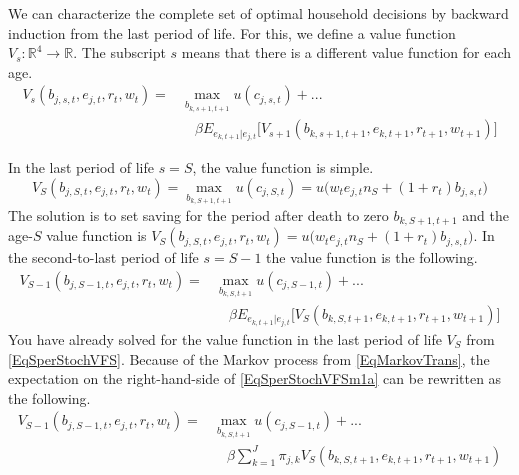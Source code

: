 \documentclass[letterpaper,12pt]{article}
\theoremstyle{definition}
\numberwithin{equation}{section}
\numberwithin{exercise}{section}
\begin{document}
\begin{spacing}{1.5}
      We can characterize the complete set of optimal household decisions by backward induction from the last period of life. For this, we define a value function $V_s:\mathbb{R}^4\rightarrow\mathbb{R}$. The subscript $s$ means that there is a different value function for each age.
      \begin{equation}\label{EqSperStochVF}
         \begin{split}
            V_s\left(b_{j,s,t},e_{j,t},r_t,w_t\right) = &\max_{b_{k,s+1,t+1}} u\left(c_{j,s,t}\right) + ... \\
            &\quad\beta E_{e_{k,t+1}|e_{j,t}}\bigl[V_{s+1}\left(b_{k,s+1,t+1},e_{k,t+1},r_{t+1},w_{t+1}\right)\bigr]
         \end{split}
      \end{equation}

      In the last period of life $s=S$, the value function is simple.
      \begin{equation}\label{EqSperStochVFS}
         V_{S}\left(b_{j,S,t},e_{j,t},r_t,w_t\right) = \max_{b_{k,S+1,t+1}} u\left(c_{j,S,t}\right) = u\bigl(w_t e_{j,t}n_{S} + (1 + r_t)b_{j,s,t}\bigr)
      \end{equation}
      The solution is to set saving for the period after death to zero $b_{k,S+1,t+1}$ and the age-$S$ value function is $V_{S}\left(b_{j,S,t},e_{j,t},r_t,w_t\right) = u\bigl(w_t e_{j,t}n_{S} + (1 + r_t)b_{j,s,t}\bigr)$.
      In the second-to-last period of life $s=S-1$ the value function is the following.
      \begin{equation}\label{EqSperStochVFSm1a}
         \begin{split}
            V_{S-1}\left(b_{j,S-1,t},e_{j,t},r_t,w_t\right) = &\max_{b_{k,S,t+1}} u\left(c_{j,S-1,t}\right) + ... \\
            &\quad \beta E_{e_{k,t+1}|e_{j,t}}\bigl[V_{S}\left(b_{k,S,t+1},e_{k,t+1},r_{t+1},w_{t+1}\right)\bigr]
         \end{split}
      \end{equation}
      You have already solved for the value function in the last period of life $V_S$ from \eqref{EqSperStochVFS}. Because of the Markov process from \eqref{EqMarkovTrans}, the expectation on the right-hand-side of \eqref{EqSperStochVFSm1a} can be rewritten as the following.
      \begin{equation}\label{EqSperStochVFSm1b}
         \begin{split}
            V_{S-1}\left(b_{j,S-1,t},e_{j,t},r_t,w_t\right) = &\max_{b_{k,S,t+1}} u\left(c_{j,S-1,t}\right) + ... \\
            &\quad \beta \sum_{k=1}^J\pi_{j,k}V_S\left(b_{k,S,t+1},e_{k,t+1},r_{t+1},w_{t+1}\right)
         \end{split}
      \end{equation}


\end{spacing}
\end{document}
